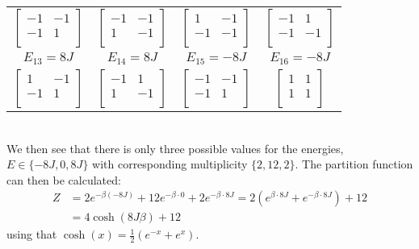 \documentclass[11pt,a4wide]{article}
\begin{document}
\begin{tabular}{cccc}
$
\left[ \begin{array}{cc} -1 & -1 \\
                             	    -1  & 1 \\
\end{array} \right]$ &
$
\left[ \begin{array}{cc} -1 & -1 \\
                             	    1  & -1 \\
\end{array} \right]$ &
$
\left[ \begin{array}{cc} 1 & -1 \\
                             	    -1  & -1 \\
\end{array} \right]$ &
$
\left[ \begin{array}{cc} -1 & 1 \\
                             	    -1  & -1 \\
\end{array} \right]$ \\
$E_{13} = 8J$ & $E_{14} = 8J$ & $E_{15} = -8J$& $E_{16} = -8J$ \\ 
$
\left[ \begin{array}{cc} 1 & -1 \\
                             	    -1  & 1 \\
\end{array} \right]$ &
$
\left[ \begin{array}{cc} -1 & 1 \\
                             	    1  & -1 \\
\end{array} \right]$ &
$
\left[ \begin{array}{cc} -1 & -1 \\
                             	    -1  & 1 \\
\end{array} \right]$ &
$
\left[ \begin{array}{cc} 1 & 1 \\
                             	    1  & 1 \\
\end{array} \right]$
\end{tabular}
\\
We then see that there is only three possible values for the energies, $E \in \{-8J, 0, 8J\}$ with corresponding multiplicity $\{2, 12, 2\}$. The partition function can then be calculated:
\begin{align*}
Z &= 2e^{-\beta (-8J)} + 12e^{-\beta \cdot 0} + 2 e^{-\beta \cdot 8J} = 2(e^{\beta \cdot 8J}  + e^{-\beta \cdot 8J}) + 12 \\
&= 4\cosh(8J\beta) + 12
\end{align*}
using that $\cosh(x) = \frac{1}{2}(e^{-x} + e^x)$.
\end{document}
